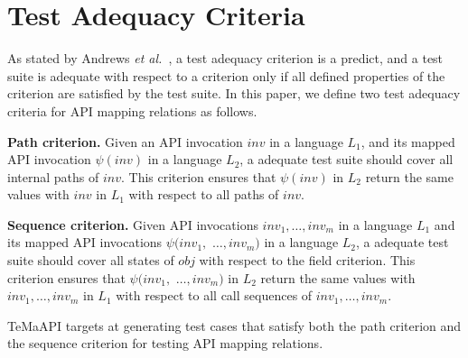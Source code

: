 \section{Test Adequacy Criteria}
\label{sec:mapping}
As stated by Andrews \emph{et al.}~\cite{andrews2003test}, a test adequacy criterion is a predict, and a test suite is adequate with respect to a criterion only if all defined properties of the criterion are satisfied by the test suite. In this paper, we define two test adequacy criteria for API mapping relations as follows.

\textbf{Path criterion.} Given an API invocation $inv$ in a language $L_1$, and its mapped API invocation $\psi(inv)$ in a language $L_2$, a adequate test suite should cover all internal paths of $inv$. This criterion ensures that  $\psi(inv)$ in $L_2$ return the same values with $inv$ in $L_1$ with respect to all paths of $inv$.

\textbf{Sequence criterion.} Given API invocations $inv_{1},\ldots,inv_{m}$ in a language $L_1$ and its mapped API invocations $\psi(inv_{1},$ $\ldots,inv_{m})$ in a language $L_2$, a adequate test suite should cover all states of $obj$ with respect to the field criterion. This criterion ensures that  $\psi(inv_{1},$ $\ldots,inv_{m})$ in $L_2$ return the same values with $inv_{1},\ldots,inv_{m}$ in $L_1$ with respect to all call sequences of $inv_{1},\ldots,inv_{m}$.

TeMaAPI targets at generating test cases that satisfy both the path criterion and the sequence criterion for testing API mapping relations.
